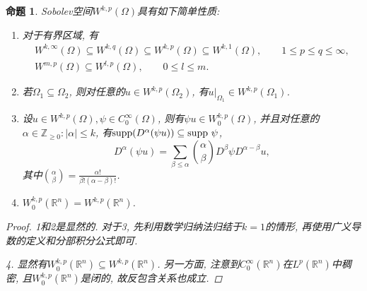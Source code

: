 \documentclass[12pt,a4paper]{article}
\newtheorem{proposition}[theorem]{命题}
\begin{document}
\begin{proposition}
    Sobolev空间$W^{k, p}(\Omega)$具有如下简单性质:
    \begin{enumerate}
        \item 对于有界区域, 有 
        \begin{gather*}
            W^{k, \infty}(\Omega) \subseteq W^{k, q}(\Omega) \subseteq W^{k, p}(\Omega) \subseteq W^{k, 1}(\Omega), \qquad 1 \leq p \leq q \leq \infty, \\ 
            W^{m, p}(\Omega) \subseteq W^{l, p}(\Omega), \qquad 0 \leq l \leq m.
        \end{gather*}
        \item 若$\Omega_1 \subseteq \Omega_2$, 则对任意的$u \in W^{k, p}(\Omega_2)$, 有$u|_{\Omega_1} \in W^{k, p}(\Omega_1)$.
        \item 设$u \in W^{k, p}(\Omega), \psi \in C_0^{\infty}(\Omega)$, 则有$\psi u \in W_0^{k, p}(\Omega)$, 并且对任意的$\alpha \in \mathbb{Z}_{\geq 0}\colon |\alpha| \leq k$, 有${\rm supp}(D^{\alpha}(\psi u)) \subseteq {\rm supp}\ \psi$, 
        \begin{equation*}
            D^{\alpha}(\psi u) = \sum_{\beta \leq \alpha}\binom{\alpha}{\beta}D^{\beta}\psi D^{\alpha - \beta}u,
        \end{equation*} 
        其中$\binom{\alpha}{\beta} = \frac{\alpha!}{\beta!(\alpha - \beta)!}$.
        \item $W_0^{k, p}(\mathbb{R}^n) = W^{k, p}(\mathbb{R}^n)$.
    \end{enumerate}
    \begin{proof}
        1和2是显然的. 对于3, 先利用数学归纳法归结于$k = 1$的情形, 再使用广义导数的定义和分部积分公式即可.
        
        4. 显然有$W_0^{k, p}(\mathbb{R}^n) \subseteq W^{k, p}(\mathbb{R}^n)$.
        另一方面, 注意到$C_0^{\infty}(\mathbb{R}^n)$在$L^p(\mathbb{R}^n)$中稠密, 且$W_0^{k, p}(\mathbb{R}^n)$是闭的, 故反包含关系也成立.
    \end{proof}
\end{proposition}
\end{document}
